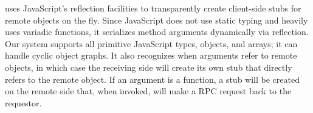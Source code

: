 \nodermi uses JavaScript's reflection facilities to transparently create client-side 
stubs for remote objects on the fly.
Since JavaScript does not use static typing and heavily uses variadic functions,
it serializes method arguments dynamically via reflection.  Our system supports all
primitive Java\-Script types, objects, and arrays; it can handle cyclic 
object graphs.  It also recognizes when arguments refer to remote objects, in which case 
the receiving side will create its own stub that directly refers to the remote object.
If an argument is a function, a stub will be created on the remote side that, when 
invoked, will make a RPC request back to the requestor.

